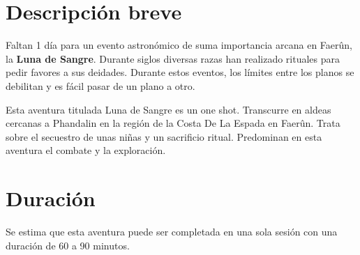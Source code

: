 \documentclass[10pt,twoside,twocolumn,openany]{dndbook}
\begin{document}
\section*{Descripción breve}

Faltan 1 día para un evento astronómico de suma importancia arcana en Faerûn, la \textbf{Luna de Sangre}. 
Durante siglos diversas razas han realizado rituales para pedir favores a sus deidades. Durante 
estos eventos, los límites entre los planos se debilitan y es fácil pasar de un plano a otro.

Esta aventura titulada Luna de Sangre es un one shot. Transcurre en aldeas cercanas a Phandalin en 
la región de la Costa De La Espada en Faerûn. Trata sobre el secuestro de unas niñas y un 
sacrificio ritual. Predominan en esta aventura el combate y la exploración.

\section*{Duración}

Se estima que esta aventura puede ser completada en una sola sesión con una duración de 60 a 90 
minutos.



\end{document}
